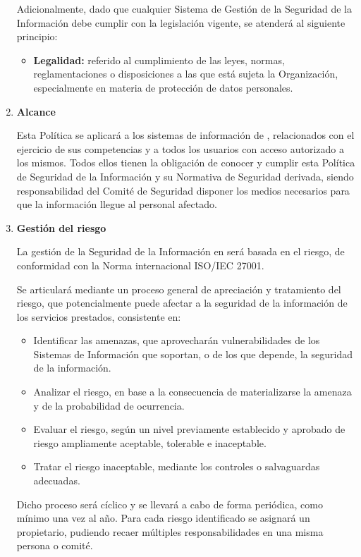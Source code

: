 \begin{enumerate}[label=\alph*)]
Adicionalmente, dado que cualquier Sistema de Gestión de la Seguridad de la Información debe cumplir con la legislación vigente, se atenderá al siguiente principio:

\begin{itemize}
  \item \textbf{Legalidad:} referido al cumplimiento de las leyes, normas, reglamentaciones o disposiciones a las que está sujeta la Organización, especialmente en materia de protección de datos personales.
\end{itemize}

\item \textbf{Alcance}

Esta Política se aplicará a los sistemas de información de \Beneficiario, relacionados con el ejercicio de sus competencias y a todos los usuarios con acceso autorizado a los mismos. Todos ellos tienen la obligación de conocer y cumplir esta Política de Seguridad de la Información y su Normativa de Seguridad derivada, siendo responsabilidad del Comité de Seguridad disponer los medios necesarios para que la información llegue al personal afectado.

\item \textbf{Gestión del riesgo}

La gestión de la Seguridad de la Información en \Beneficiario será basada en el riesgo, de conformidad con la Norma internacional ISO/IEC 27001.

Se articulará mediante un proceso general de apreciación y tratamiento del riesgo, que potencialmente puede afectar a la seguridad de la información de los servicios prestados, consistente en:

\begin{itemize}
    \item Identificar las amenazas, que aprovecharán vulnerabilidades de los Sistemas de Información que soportan, o de los que depende, la seguridad de la información.
    \item Analizar el riesgo, en base a la consecuencia de materializarse la amenaza y de la probabilidad de ocurrencia.
    \item Evaluar el riesgo, según un nivel previamente establecido y aprobado de riesgo ampliamente aceptable, tolerable e inaceptable.
    \item Tratar el riesgo inaceptable, mediante los controles o salvaguardas adecuadas.
\end{itemize}

Dicho proceso será cíclico y se llevará a cabo de forma periódica, como mínimo una vez al año. Para cada riesgo identificado se asignará un propietario, pudiendo recaer múltiples responsabilidades en una misma persona o comité.


\end{enumerate}
